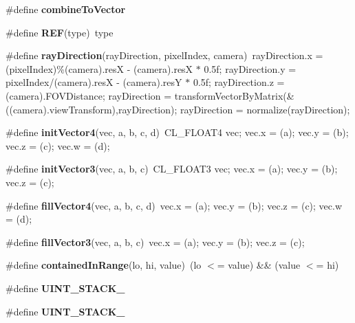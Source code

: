 \begin{DoxyCompactItemize}
\item 
\#define {\bfseries combine\+To\+Vector}\hypertarget{group__g15_ga98910bf35d43fe6e20f3965f35f52c84}{}\label{group__g15_ga98910bf35d43fe6e20f3965f35f52c84}

\item 
\#define {\bfseries R\+EF}(type)~type\hypertarget{group__g15_ga3e4a2dea4db126ef5ee865231e19cdf6}{}\label{group__g15_ga3e4a2dea4db126ef5ee865231e19cdf6}

\item 
\#define {\bfseries ray\+Direction}(ray\+Direction,  pixel\+Index,  camera)~ray\+Direction.\+x = (pixel\+Index)\%(camera).resX -\/ (camera).resX $\ast$ 0.\+5f; ray\+Direction.\+y = pixel\+Index/(camera).\+res\+X -\/ (camera).\+res\+Y $\ast$ 0.\+5f; ray\+Direction.\+z = (camera).\+F\+O\+V\+Distance; ray\+Direction = transform\+Vector\+By\+Matrix(\&((camera).\+view\+Transform),ray\+Direction); ray\+Direction = normalize(ray\+Direction);\hypertarget{group__g15_ga25ce3e6422948720709d0eaf4a291eb5}{}\label{group__g15_ga25ce3e6422948720709d0eaf4a291eb5}

\item 
\#define {\bfseries init\+Vector4}(vec,  a,  b,  c,  d)~C\+L\+\_\+\+F\+L\+O\+A\+T4 vec; vec.\+x = (a); vec.\+y = (b); vec.\+z = (c); vec.\+w = (d);\hypertarget{group__g15_ga05f90a10d56f74f5ca011bc209f73437}{}\label{group__g15_ga05f90a10d56f74f5ca011bc209f73437}

\item 
\#define {\bfseries init\+Vector3}(vec,  a,  b,  c)~C\+L\+\_\+\+F\+L\+O\+A\+T3 vec; vec.\+x = (a); vec.\+y = (b); vec.\+z = (c);\hypertarget{group__g15_ga035693aa46870a719aeb8d2f772c2e51}{}\label{group__g15_ga035693aa46870a719aeb8d2f772c2e51}

\item 
\#define {\bfseries fill\+Vector4}(vec,  a,  b,  c,  d)~vec.\+x = (a); vec.\+y = (b); vec.\+z = (c); vec.\+w = (d);\hypertarget{group__g15_ga9e37383562ffb32a238c0754cb39243d}{}\label{group__g15_ga9e37383562ffb32a238c0754cb39243d}

\item 
\#define {\bfseries fill\+Vector3}(vec,  a,  b,  c)~vec.\+x = (a); vec.\+y = (b); vec.\+z = (c);\hypertarget{group__g15_gaacdab40fef5abba8a91319bbae3bca29}{}\label{group__g15_gaacdab40fef5abba8a91319bbae3bca29}

\item 
\#define {\bfseries contained\+In\+Range}(lo,  hi,  value)~(lo $<$= value) \&\& (value $<$= hi)\hypertarget{group__g15_ga9058edd1a5fad61addd7ae87ed191b09}{}\label{group__g15_ga9058edd1a5fad61addd7ae87ed191b09}

\item 
\#define {\bfseries U\+I\+N\+T\+\_\+\+S\+T\+A\+C\+K\+\_}
\item 
\#define {\bfseries U\+I\+N\+T\+\_\+\+S\+T\+A\+C\+K\+\_}
\end{DoxyCompactItemize}

